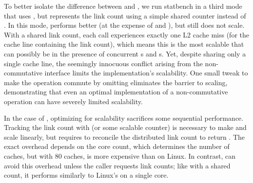 To better
isolate the difference between  and , we run
statbench in a
third mode that uses , but represents the link count
using a simple shared counter instead of .  In this mode, 
performs better (at the expense of  and ), but
still does not scale.  With a shared link count, each 
call experiences exactly one L2 cache miss (for the cache line
containing the link count), which means this is the most scalable that
 can possibly be in the presence of concurrent s
and s.  Yet, despite sharing only a single cache line, the
seemingly innocuous conflict arising from the non-commutative
interface limits the
implementation's scalability.  One small tweak to make the operation
commute by omitting  eliminates the barrier to scaling,
demonstrating that even an optimal implementation of a non-commutative
operation can have severely limited scalability.

In the case of , optimizing for scalability sacrifices some
sequential performance.  Tracking the link count with 
(or some scalable counter) is necessary to make  and
 scale linearly, but requires  to reconcile the
distributed link count to return .  The exact overhead
depends on the core count, which determines the number of 
caches, but with 80  caches,  is 
more expensive than on Linux.  
%
In contrast,  can avoid this overhead unless the caller
requests link counts; like  with a shared count, it
performs similarly to Linux's  on a single core.

